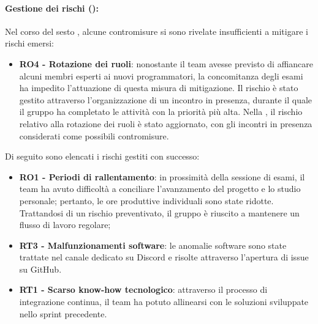 \paragraph*{Gestione dei rischi ():}
\par Nel corso del sesto , alcune contromisure si sono rivelate insufficienti a mitigare i rischi emersi:
\begin{itemize}
  \item \textbf{RO4 - Rotazione dei ruoli}: nonostante il team avesse previsto di affiancare alcuni membri esperti ai nuovi programmatori, la concomitanza degli esami ha impedito l'attuazione di questa misura di mitigazione. Il rischio è stato gestito attraverso l’organizzazione di un incontro in presenza, durante il quale il gruppo ha completato le attività con la priorità più alta. Nella , il rischio relativo alla rotazione dei ruoli è stato aggiornato, con gli incontri in presenza considerati come possibili contromisure.
\end{itemize}

\par Di seguito sono elencati i rischi gestiti con successo:
\begin{itemize}
  \item \textbf{RO1 - Periodi di rallentamento}: in prossimità della sessione di esami, il team ha avuto difficoltà a conciliare l'avanzamento del progetto e lo studio personale; pertanto, le ore produttive individuali sono state ridotte. Trattandosi di un rischio preventivato, il gruppo è riuscito a mantenere un flusso di lavoro regolare;
  \item \textbf{RT3 - Malfunzionamenti software}: le anomalie software sono state trattate nel canale dedicato su Discord e risolte attraverso l'apertura di issue su GitHub.
  \item \textbf{RT1 - Scarso know-how tecnologico}: attraverso il processo di integrazione continua, il team ha potuto allinearsi con le soluzioni sviluppate nello sprint precedente.
\end{itemize}
